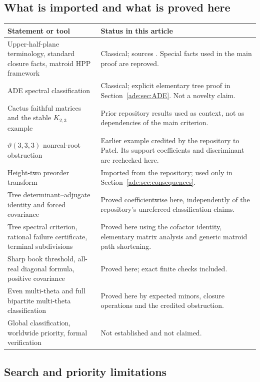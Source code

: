 \documentclass[11pt]{article}
\numberwithin{equation}{section}
\theoremstyle{definition}
\begin{document}
\subsection{What is imported and what is proved here}
\begin{center}\small
\begin{tabularx}{\textwidth}{@{}>{\raggedright\arraybackslash}p{}Y@{}}
\toprule
Statement or tool & Status in this article\\
\midrule
Upper-half-plane terminology, standard closure facts, matroid HPP framework
& Classical; sources \cite{COSW,Branden}.  Special facts used in the main
proof are reproved.\\
ADE spectral classification
& Classical; explicit elementary tree proof in Section~\ref{ade:sec:ADE}.
Not a novelty claim.\\
Cactus faithful matrices and the stable $K_{2,3}$ example
& Prior repository results used as context, not as dependencies of the
main criterion.\\
$\vartheta(3,3,3)$ nonreal-root obstruction
& Earlier example credited by the repository to Patel.  Its support
coefficients and discriminant are rechecked here.\\
Height-two preorder transform
& Imported from the repository; used only in
Section~\ref{ade:sec:consequences}.\\
Tree determinant--adjugate identity and forced covariance
& Proved coefficientwise here, independently of the repository's
unrefereed classification claims.\\
Tree spectral criterion, rational failure certificate, terminal subdivisions
& Proved here using the cofactor identity, elementary matrix analysis and
generic matroid path shortening.\\
Sharp book threshold, all-real diagonal formula, positive covariance
& Proved here; exact finite checks included.\\
Even multi-theta and full bipartite multi-theta classification
& Proved here by expected minors, closure operations and the credited
obstruction.\\
Global classification, worldwide priority, formal verification
& Not established and not claimed.\\
\end{tabularx}
\end{center}

\subsection{Search and priority limitations}
\end{document}
